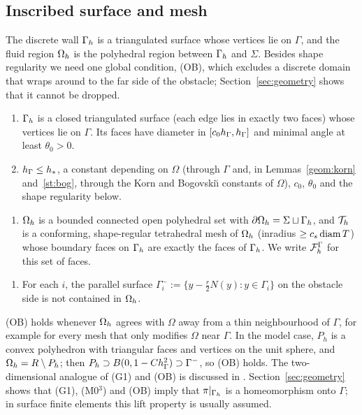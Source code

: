 \subsection{Inscribed surface and mesh}
The discrete wall $\Gamma_h$ is a triangulated surface whose vertices lie on $\Gamma$, and the fluid region $\Omega_h$ is the polyhedral region between $\Gamma_h$ and $\Sigma$. Besides shape regularity we need one global condition, (OB), which excludes a discrete domain that wraps around to the far side of the obstacle; Section~\ref{sec:geometry} shows that it cannot be dropped.
\begin{assumption}\label{set:mesh}\leavevmode
\begin{enumerate}[label=(G\arabic*)]
\item $\Gamma_h$ is a closed triangulated surface (each edge lies in exactly two faces) whose vertices lie on $\Gamma$. Its faces have diameter in $[c_0h_\Gamma,h_\Gamma]$ and minimal angle at least $\theta_0>0$.
\item[(G3)] $h_\Gamma\le h_\ast$, a constant depending on $\Omega$ (through $\Gamma$ and, in Lemmas~\ref{geom:korn} and~\ref{st:bog}, through the Korn and Bogovski\u{\i} constants of $\Omega$), $c_0$, $\theta_0$ and the shape regularity below.
\end{enumerate}
\begin{enumerate}[label=(M0$^3$)]
\item $\Omega_h$ is a bounded connected open polyhedral set with $\partial\Omega_h=\Sigma\sqcup\Gamma_h$, and $\mathcal T_h$ is a conforming, shape-regular tetrahedral mesh of $\Omega_h$ (inradius $\ge c_s\operatorname{diam} T$) whose boundary faces on $\Gamma_h$ are exactly the faces of $\Gamma_h$. We write $\mathcal F_h^\Gamma$ for this set of faces.
\end{enumerate}
\begin{enumerate}[label=(OB)]
\item For each $i$, the parallel surface $\Gamma_i^-:=\{y-\frac r2N(y):y\in\Gamma_i\}$ on the obstacle side is not contained in $\Omega_h$.
\end{enumerate}
\end{assumption}

(OB) holds whenever $\Omega_h$ agrees with $\Omega$ away from a thin neighbourhood of $\Gamma$, for example for every mesh that only modifies $\Omega$ near $\Gamma$. In the model case, $P_h$ is a convex polyhedron with triangular faces and vertices on the unit sphere, and $\Omega_h=R\setminus P_h$; then $P_h\supset B(0,1-Ch_\Gamma^2)\supset\Gamma^-$, so (OB) holds. The two-dimensional analogue of (G1) and (OB) is discussed in \cite{PadhiLong2D}. Section~\ref{sec:geometry} shows that (G1), (M0$^3$) and (OB) imply that $\pi|_{\Gamma_h}$ is a homeomorphism onto $\Gamma$; in surface finite elements this lift property is usually assumed.

